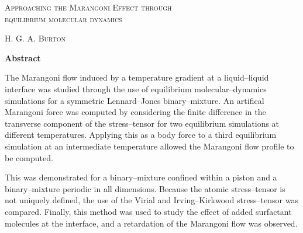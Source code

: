 \thispagestyle{plain}
\begin{center}
\textsc{\Large Approaching the Marangoni Effect through\\ equilibrium molecular dynamics}

    \vspace{0.2cm}
    \normalsize{{\textsc{H. G. A. Burton}}}
    
\vspace{0.2cm}
    \normalsize{\textbf{Abstract}}
\end{center}
The Marangoni flow induced by a temperature gradient at a liquid--liquid interface was studied through the use of equilibrium molecular--dynamics simulations for a symmetric Lennard--Jones binary--mixture.
An artifical Marangoni force was computed by considering the finite difference in the transverse component of the stress--tensor for two equilibrium simulations at different temperatures.
Applying this as a body force to a third equilibrium simulation at an intermediate temperature allowed the Marangoni flow profile to be computed.

This was demonstrated for a binary--mixture confined within a piston and a binary--mixture periodic in all dimensions. Because the atomic stress--tensor is not uniquely defined, the use of the Virial and Irving--Kirkwood stress--tensor was compared.
Finally, this method was used to study the effect of added surfactant molecules at the interface, and a retardation of the Marangoni flow was observed.
